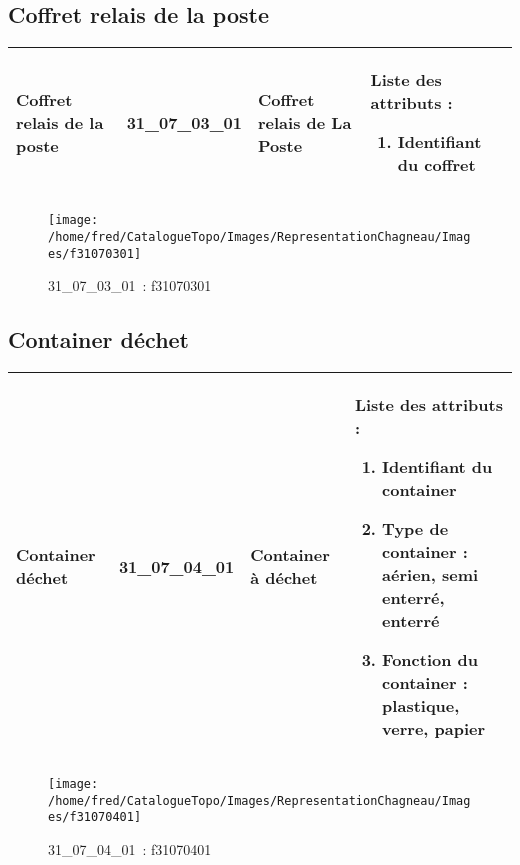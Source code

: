 \documentclass[12pt,titlepage]{book}
\begin{document}
\subsection{Coffret relais de la poste}
\noindent
\vspace{\baselineskip}

\renewcommand{\arraystretch}{1.2}
\begin{supertabular}{|p{10cm}|c|p{13cm}|p{12cm}|}
 Coffret relais de la poste & 31\_07\_03\_01 & Coffret relais de La Poste & Liste des attributs :
\begin{enumerate}
  \item Identifiant du coffret\end{enumerate}
\\
\hline
\end{supertabular}
\begin{figure}[h!]
  \hfill         %
  \begin{minipage}[t]{3cm}
    \begin{center}
      \texttt{[image: /home/fred/CatalogueTopo/Images/RepresentationChagneau/Images/f31070301]}
      \caption[~31\_07\_03\_01]{\small{31\_07\_03\_01~:} \tiny{f31070301}}\label{f31070301}
    \end{center}
  \end{minipage}
\end{figure}


\subsection{Container déchet}
\noindent
\vspace{\baselineskip}

\renewcommand{\arraystretch}{1.2}
\begin{supertabular}{|p{10cm}|c|p{13cm}|p{12cm}|}
 Container déchet & 31\_07\_04\_01 & Container à déchet & Liste des attributs :
\begin{enumerate}
  \item Identifiant du container  \item Type de container : aérien, semi enterré, enterré  \item Fonction du container : plastique, verre, papier\end{enumerate}
\\
\hline
\end{supertabular}
\begin{figure}[h!]
  \hfill         %
  \begin{minipage}[t]{3cm}
    \begin{center}
      \texttt{[image: /home/fred/CatalogueTopo/Images/RepresentationChagneau/Images/f31070401]}
      \caption[~31\_07\_04\_01]{\small{31\_07\_04\_01~:} \tiny{f31070401}}\label{f31070401}
    \end{center}
  \end{minipage}
\end{figure}
\end{document}
